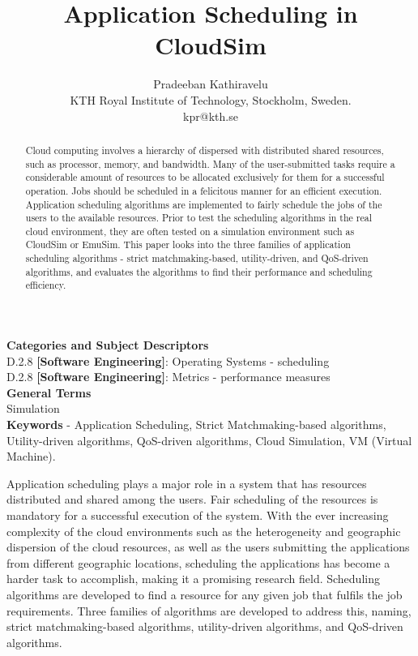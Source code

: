 \documentclass[times, 10pt,twocolumn]{article}
\begin{document}
\title{Application Scheduling in CloudSim}

\author{Pradeeban Kathiravelu\\
KTH Royal Institute of Technology, Stockholm, Sweden.\\ kpr@kth.se\\
}

\maketitle
\thispagestyle{empty}

\begin{abstract}
   Cloud computing involves a  hierarchy of dispersed with distributed shared resources, such as processor, memory, and bandwidth. Many of the user-submitted tasks require a considerable amount of resources to be allocated exclusively for them for a successful operation. Jobs should be scheduled in a felicitous manner for an efficient execution. Application scheduling algorithms are implemented to fairly schedule the jobs of the users to the available resources. Prior to test the scheduling algorithms in the real cloud environment, they are often tested on a simulation environment such as CloudSim or EmuSim. This paper looks into the three families of application scheduling algorithms -  strict matchmaking-based, utility-driven, and QoS-driven algorithms, and evaluates the algorithms to find their performance and scheduling efficiency. 
\end{abstract}


\textbf{Categories and Subject Descriptors}\\
D.2.8 \textbf{[Software Engineering]}: Operating Systems - scheduling\\
D.2.8 \textbf{[Software Engineering]}: Metrics - performance measures\\
\textbf{General Terms}\\
Simulation\\
\textbf{Keywords} -  Application Scheduling, Strict Matchmaking-based algorithms, Utility-driven algorithms, QoS-driven algorithms, Cloud Simulation, VM (Virtual Machine).


Application scheduling plays a major role in a system that has resources distributed and shared among the users. Fair scheduling of the resources is mandatory for a successful execution of the system. With the ever increasing complexity of the cloud environments such as the heterogeneity and geographic dispersion of the cloud resources, as well as the users submitting the applications from different geographic locations, scheduling the applications has become a harder task to accomplish, making it a promising research field. Scheduling algorithms are developed to find a resource for any given job that fulfils the job requirements. Three families of algorithms are developed to address this, naming, strict matchmaking-based algorithms, utility-driven algorithms, and QoS-driven algorithms.
\end{document}

